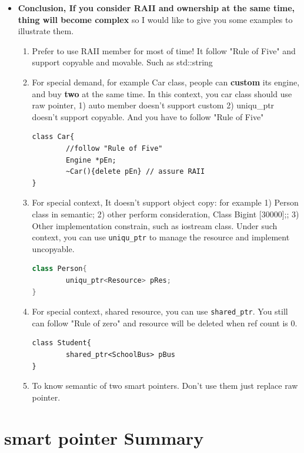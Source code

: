 \documentclass[a4paper,11pt,twoside]{book}
\begin{document}
\begin{itemize}
	
	\item \textbf{ Conclusion, If you consider RAII and ownership at the same time, thing will become complex}  so I would like to give you some examples to illustrate them.
	
	\begin{enumerate}
		\item Prefer to use RAII member for most of time! It follow "Rule of Five" and support copyable and movable. Such as std::string
		
		\item  For special demand, for example Car class,  people can \textbf{custom} its engine, and buy \textbf{two} at the same time. In this context, you car class should use raw pointer, 1) auto member doesn't support custom 2) uniqu\_ptr doesn't support copyable.  And you have to follow "Rule of Five"
\begin{lstlisting}[numbers=none]
class Car{
		//follow "Rule of Five"
		Engine *pEn;
		~Car(){delete pEn} // assure RAII
}
\end{lstlisting}
		
		\item For special context, It doesn't support object copy: for example 1) Person class in semantic;  2) other  perform consideration, Class Big{int [30000];};  3) Other implementation constrain, such as iostream class.   Under such context, you can use \texttt{uniqu\_ptr} to manage the resource and implement uncopyable.
\begin{lstlisting}[frame=single, language=c++]
class Person{
		uniqu_ptr<Resource> pRes;
}
		\end{lstlisting}
		
		\item For special context, shared resource, you can use \texttt{shared\_ptr}.  You still can follow "Rule of zero" and resource will be deleted when ref count is 0.
\begin{lstlisting}[numbers=none]
class Student{
		shared_ptr<SchoolBus> pBus
}
\end{lstlisting}
		
		\item To know semantic of two smart pointers. Don't use them just replace raw pointer.
	\end{enumerate}

\end{itemize}


\section{smart pointer Summary}
\end{document}

